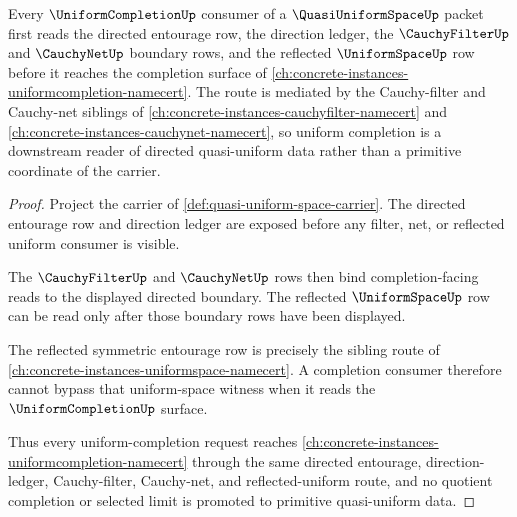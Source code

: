 \begin{theorem}
\label{thm:quasi-uniform-space-uniform-completion-dependency-route}
Every $\UniformCompletionUp$ consumer of a $\QuasiUniformSpaceUp$ packet first reads the directed entourage row, the direction ledger, the $\CauchyFilterUp$ and $\CauchyNetUp$ boundary rows, and the reflected $\UniformSpaceUp$ row before it reaches the completion surface of \autoref{ch:concrete-instances-uniformcompletion-namecert}. The route is mediated by the Cauchy-filter and Cauchy-net siblings of \autoref{ch:concrete-instances-cauchyfilter-namecert} and \autoref{ch:concrete-instances-cauchynet-namecert}, so uniform completion is a downstream reader of directed quasi-uniform data rather than a primitive coordinate of the carrier.
\end{theorem}
\begin{proof}
Project the carrier of \autoref{def:quasi-uniform-space-carrier}. The directed entourage row and direction ledger are exposed before any filter, net, or reflected uniform consumer is visible.

The $\CauchyFilterUp$ and $\CauchyNetUp$ rows then bind completion-facing reads to the displayed directed boundary. The reflected $\UniformSpaceUp$ row can be read only after those boundary rows have been displayed.

The reflected symmetric entourage row is precisely the sibling route of \autoref{ch:concrete-instances-uniformspace-namecert}. A completion consumer therefore cannot bypass that uniform-space witness when it reads the $\UniformCompletionUp$ surface.

Thus every uniform-completion request reaches \autoref{ch:concrete-instances-uniformcompletion-namecert} through the same directed entourage, direction-ledger, Cauchy-filter, Cauchy-net, and reflected-uniform route, and no quotient completion or selected limit is promoted to primitive quasi-uniform data.
\end{proof}
